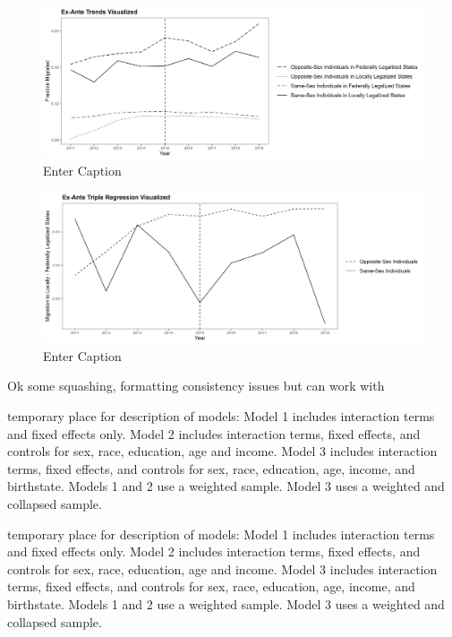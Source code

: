 \documentclass[]{article}
\begin{document}
\begin{figure}
    \centering
    \includegraphics[width=1\linewidth]{outputs/summary_stats/ante_trends.png}
    \caption{Enter Caption}
    \label{fig:enter-label}
\end{figure}

\begin{figure}
    \centering
    \includegraphics[width=1\linewidth]{outputs/summary_stats/ante_diffs.png}
    \caption{Enter Caption}
    \label{fig:enter-label}
\end{figure}
Ok some squashing, formatting consistency issues but can work with


\clearpage



temporary place for description of models:
Model 1 includes interaction terms and fixed effects only. Model 2 includes interaction terms, fixed effects, and controls for sex, race, education, age and income. Model 3 includes interaction terms, fixed effects, and controls for sex, race, education, age, income, and birthstate. Models 1 and 2 use a weighted sample. Model 3 uses a weighted and collapsed sample.

\clearpage


temporary place for description of models:
Model 1 includes interaction terms and fixed effects only. Model 2 includes interaction terms, fixed effects, and controls for sex, race, education, age and income. Model 3 includes interaction terms, fixed effects, and controls for sex, race, education, age, income, and birthstate. Models 1 and 2 use a weighted sample. Model 3 uses a weighted and collapsed sample.
\clearpage
\hspace{-4cm}


\hspace{-4cm}

\end{document}
